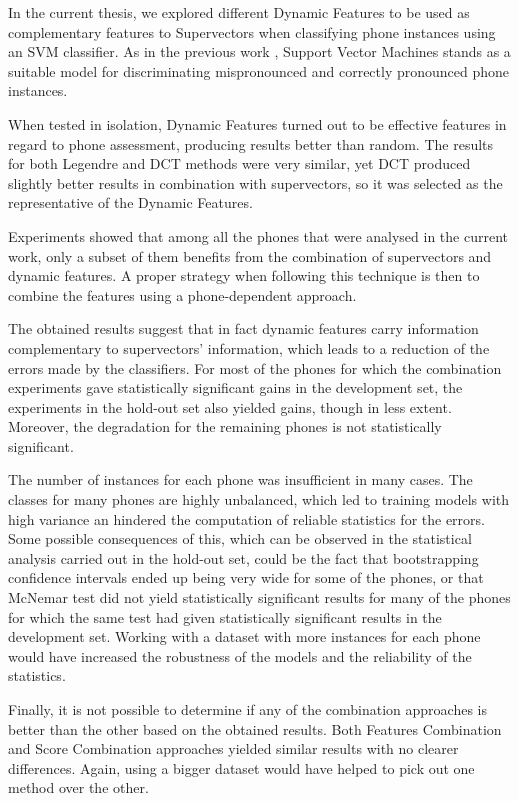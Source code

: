 In the current thesis, we explored different Dynamic Features to be used as complementary features to
Supervectors when classifying phone instances using an SVM classifier. As in the previous work \cite{main},
Support Vector Machines stands as a suitable model for discriminating mispronounced and correctly
pronounced phone instances.

When tested in isolation, Dynamic Features turned out to be effective features in regard to
phone assessment, producing results better than random. The results for both
Legendre and DCT methods were very similar, yet DCT produced slightly better results in combination with
supervectors, so it was selected as the representative of the Dynamic Features.

Experiments showed that among all the phones that were analysed in the current work, only a subset of them
benefits from the combination of supervectors and dynamic features. A proper strategy when following this
technique is then to combine the features using a phone-dependent approach.

The obtained results suggest that in fact dynamic features carry
information complementary to supervectors' information, which leads to a reduction of the errors
made by the classifiers. For most of the phones for which the combination experiments gave statistically significant gains in the development set, the experiments in the hold-out set also yielded gains,
though in less extent. Moreover, the degradation for the remaining phones
is not statistically significant.

The number of instances for each phone was insufficient in many cases. The classes for many
phones are highly unbalanced, which led to training models with high variance an
hindered the computation of reliable statistics for the errors.
Some possible consequences
of this, which can be observed in the statistical analysis carried out in the hold-out set,
could be the fact that bootstrapping
confidence intervals ended up being very wide for some of the phones,
or that McNemar test did not yield statistically significant results for many of the phones
for which the same test had given statistically significant results in the development set.
Working with a dataset with more instances for each phone would have increased the robustness
of the models and the reliability of the statistics.

Finally, it is not possible to determine if any of the combination approaches is better than the other based
on the obtained results. Both Features Combination and Score Combination approaches yielded
similar results with no clearer differences. Again, using a bigger dataset would have helped to pick out one
method over the other.
